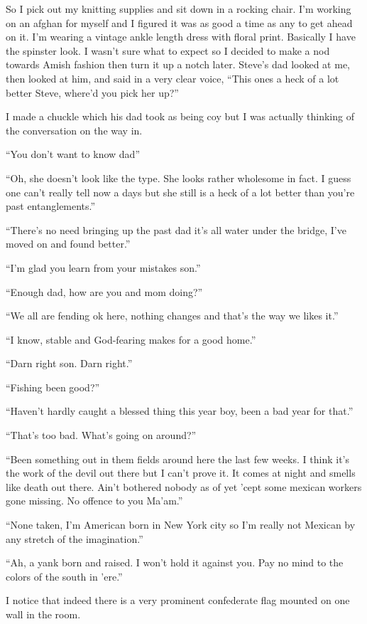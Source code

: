 So I pick out my knitting supplies and sit down in a rocking chair. I'm working on an afghan for myself and I figured it was as good a time as any to get ahead on it. I'm wearing a vintage ankle length dress with floral print. Basically I have the spinster look. I wasn't sure what to expect so I decided to make a nod towards Amish fashion then turn it up a notch later. Steve's dad looked at me, then looked at him, and said in a very clear voice, ``This ones a heck of a lot better Steve, where'd you pick her up?''

I made a chuckle which his dad took as being coy but I was actually thinking of the conversation on the way in.

``You don't want to know dad''

``Oh, she doesn't look like the type. She looks rather wholesome in fact. I guess one can't really tell now a days but she still is a heck of a lot better than you're past entanglements.''

``There's no need bringing up the past dad it's all water under the bridge, I've moved on and found better.''

``I'm glad you learn from your mistakes son.''

``Enough dad, how are you and mom doing?''

``We all are fending ok here, nothing changes and that's the way we likes it.''

``I know, stable and God-fearing makes for a good home.''

``Darn right son. Darn right.''

``Fishing been good?''

``Haven't hardly caught a blessed thing this year boy, been a bad year for that.''

``That's too bad. What's going on around?''

``Been something out in them fields around here the last few weeks. I think it's the work of the devil out there but I can't prove it. It comes at night and smells like death out there. Ain't bothered nobody as of yet 'cept some mexican workers gone missing. No offence to you Ma'am.''

``None taken, I'm American born in New York city so I'm really not Mexican by any stretch of the imagination.''

``Ah, a yank born and raised. I won't hold it against you. Pay no mind to the colors of the south in 'ere.''

I notice that indeed there is a very prominent confederate flag mounted on one wall in the room.

